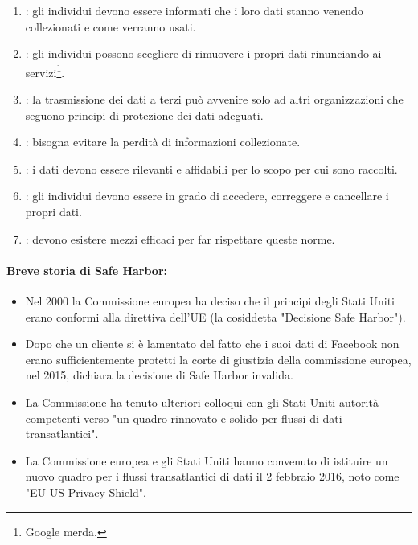 \begin{enumerate}
  \item {}: gli individui devono essere informati che i loro dati stanno venendo collezionati e come verranno usati. 
  \item {}: gli individui possono scegliere di rimuovere i propri dati rinunciando ai servizi\footnote{Google merda.}.
  \item {}: la trasmissione dei dati a terzi può avvenire solo ad altri organizzazioni che seguono principi di protezione dei dati adeguati. 
  \item {}: bisogna evitare la perdità di informazioni collezionate. 
  \item {}: i dati devono essere rilevanti e affidabili per lo scopo per cui sono raccolti. 
  \item {}: gli individui devono essere in grado di accedere, correggere e cancellare i propri dati. 
  \item {}: devono esistere mezzi efficaci per far rispettare queste norme.
\end{enumerate}

\paragraph{Breve storia di Safe Harbor:}

\begin{itemize}
  \item Nel 2000 la Commissione europea ha deciso che il principi degli Stati Uniti erano conformi alla direttiva dell'UE (la cosiddetta "Decisione Safe Harbor"). 
  \item Dopo che un cliente si è lamentato del fatto che i suoi dati di Facebook non erano sufficientemente protetti la corte di giustizia della commissione europea, nel 2015, dichiara la decisione di Safe Harbor invalida.
  \item La Commissione ha tenuto ulteriori colloqui con gli Stati Uniti autorità competenti verso "un quadro rinnovato e solido per flussi di dati transatlantici". 
  \item La Commissione europea e gli Stati Uniti hanno convenuto di istituire un nuovo quadro per i flussi transatlantici di dati il 2 febbraio 2016, noto come "EU-US Privacy Shield". 
\end{itemize}

